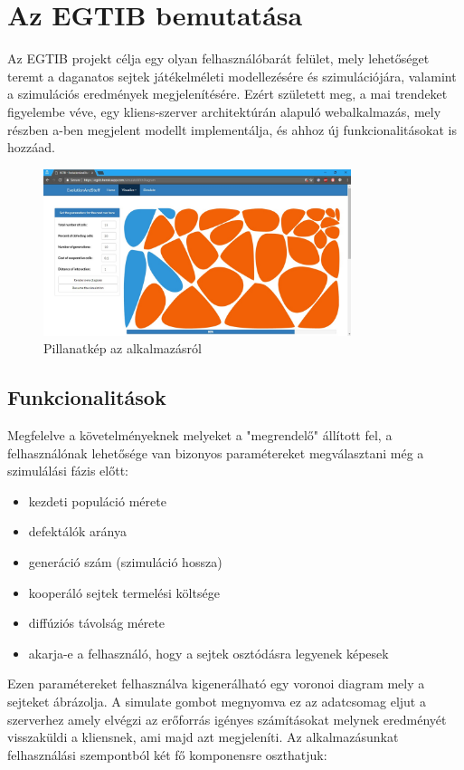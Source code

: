 \newcommand{\projectName}{Az EGTIB}

\section{\projectName{} bemutatása}

\projectName{} projekt célja egy olyan felhasználóbarát felület, mely lehetőséget teremt a daganatos sejtek játékelméleti modellezésére és szimulációjára, valamint a szimulációs eredmények megjelenítésére. Ezért született meg, a mai trendeket figyelembe véve, egy kliens-szerver architektúrán alapuló webalkalmazás, mely részben a\cite{archetti2016cooperation}-ben megjelent modellt implementálja, és ahhoz új funkcionalitásokat is hozzáad.

\begin{figure}[ht!]
	\centering
	\includegraphics[width=90mm]{images/EGTIB.jpg}
	\caption{Pillanatkép az alkalmazásról \label{fig:SimulateWithDiagram}}
\end{figure}

\subsection{Funkcionalitások}

Megfelelve a követelményeknek melyeket a "megrendelő" állított fel, a felhasználónak lehetősége van bizonyos paramétereket megválasztani még a szimulálási fázis előtt:
\begin{itemize}[noitemsep]
	\item kezdeti populáció mérete
	\item defektálók aránya 
	\item generáció szám (szimuláció hossza)
	\item kooperáló sejtek termelési költsége 
	\item diffúziós távolság mérete
	\item akarja-e a felhasználó, hogy a sejtek osztódásra legyenek képesek
\end{itemize}
Ezen paramétereket felhasználva kigenerálható egy voronoi diagram mely a sejteket ábrázolja. A simulate gombot megnyomva ez az adatcsomag eljut a szerverhez amely elvégzi az erőforrás igényes számításokat melynek eredményét visszaküldi a kliensnek, ami majd azt megjeleníti.
Az alkalmazásunkat felhasználási szempontból két fő komponensre oszthatjuk:

